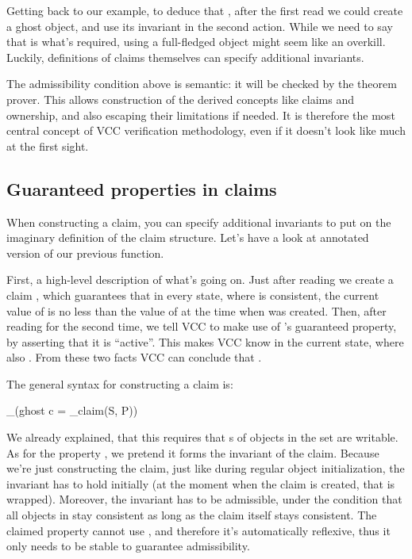 Getting back to our  example, to deduce that , after
the first read we could create a ghost  object, and
use its invariant in the second action.
While we need to say that  is what's required,
using a full-fledged object might seem like an overkill.
Luckily, definitions of claims themselves can specify additional invariants.

\begin{note}
The admissibility condition above is semantic: it will be checked by the theorem
prover. 
This allows construction of the derived concepts like claims and ownership,
and also escaping their limitations if needed.
It is therefore the most central concept of VCC verification methodology,
even if it doesn't look like much at the first sight.
\end{note}

\subsection{Guaranteed properties in claims}
\label{sect:claim-props}

When constructing a claim, you can specify additional invariants to put on
the imaginary definition of the claim structure.
Let's have a look at annotated version of our previous  function.


\noindent
First, a high-level description of what's going on.
Just after reading  we create a claim , which guarantees
that in every state, where  is consistent,
the current value of  is no less than the value of 
at the time when  was created.
Then, after reading  for the second time, we tell VCC to
make use of 's guaranteed property, by asserting that it is ``active''.
This makes VCC know  in the current state, where also
.
From these two facts VCC can conclude that .

The general syntax for constructing a claim is:

\begin{VCC}
_(ghost c = \make_claim(S, P))
\end{VCC}

\noindent
We already explained, that this requires that s of objects in the set  are writable.
As for the property , we pretend it forms the invariant of the claim.
Because we're just constructing the claim, just like during regular object initialization,
the invariant has to hold initially (\ie at the moment when the claim is created,
that is wrapped).
Moreover, the invariant has to be admissible, under the condition
that all objects in  stay consistent as long as the claim itself
stays consistent.
The claimed property cannot use , and therefore it's automatically
reflexive, thus it only needs to be stable to guarantee admissibility.

